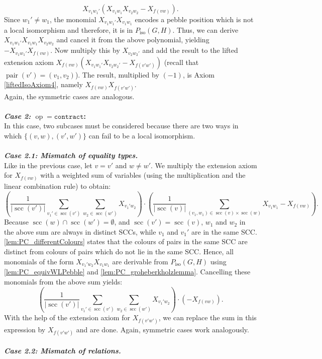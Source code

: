 \documentclass[10pt,a4paper]{article}
\newcommand{\sccOp }{\texttt{contract}}
\newcommand{\op}{\operatorname{op}}
\newcommand{\scc}{{\operatorname{scc}}}
\newcommand{\pair}{{\operatorname{pair}}}
\newcommand{\Piso}{P_{\text{iso}}}
\begin{document}
\[
X_{v_1w_1'}(X_{v_1w_1}X_{v_2w_2} - X_{f(vw)}).
\]
Since $w_1' \neq w_1$, the monomial $X_{v_1w_1'}X_{v_1w_1}$ encodes a pebble position which is not a local isomorphism and therefore, it is in $\Piso(G,H)$. Thus, we can derive $X_{v_1w_1'}X_{v_1w_1}X_{v_2w_2}$ and cancel it from the above polynomial, yielding $-X_{v_1w_1'}X_{f(vw)}$. Now multiply this by $X_{v_2w_2'}$ and add the result to the lifted extension axiom $X_{f(vw)}(X_{v_1w_1'}X_{v_2w_2'} -  X_{f(v'w')})$ (recall that $\pair(v') = (v_1,v_2)$). The result, multiplied by $(-1)$, is Axiom \eqref{liftedIsoAxiom4}, namely $X_{f(vw)}X_{f(v'w')}$.\\
Again, the symmetric cases are analogous.\\
\\
\textbf{\textit{Case 2:} $\op = \sccOp $:}\\
In this case, two subcases must be considered because there are two ways in which $\{(v,w),(v',w')\}$ can fail to be a local isomorphism.\\
\\
\textbf{\textit{Case 2.1: Mismatch of equality types.}}\\
Like in the previous case, let $v = v'$ and $w \neq w'$. 
We multiply the extension axiom for $X_{f(vw)}$ with a weighted sum of variables (using the  multiplication and the linear combination rule) to obtain:
\[
\left( \frac{1}{|\scc(v')|}\sum\limits_{v_1' \in \scc(v')}\sum\limits_{w_2 \in \scc(w')} X_{v_1'w_2} \right) \cdot \left(\frac{1}{|\scc(v)|}\sum\limits_{(v_1,w_1) \in \scc(v) \times \scc(w)}  X_{v_1  w_1} - X_{f(vw)}\right).
\]
Because $\scc(w) \cap \scc(w') = \emptyset$, and $\scc(v') = \scc(v)$, $w_1$ and $w_2$ in the above sum are always in distinct SCCs, while $v_1$ and $v_1'$ are in the same SCC. \autoref{lem:PC_differentColours} states that the colours of pairs in the same SCC are distinct from colours of pairs which do not lie in the same SCC. 
Hence, all monomials of the form $X_{v_1'w_2}X_{v_1 w_1}$ are derivable from $\Piso(G,H)$ using \autoref{lem:PC_equivWLPebble} and \autoref{lem:PC_groheberkholzlemma}. Cancelling these monomials from the above sum yields:
\[
\left( \frac{1}{|\scc(v')|}\sum\limits_{v_1' \in \scc(v')} \sum\limits_{w_2 \in \scc(w')} X_{v_1'w_2} \right) \cdot \left(- X_{f(vw)}\right).
\]
With the help of the extension axiom for $X_{f(v'w')}$, we can replace the sum in this expression by $X_{f(v'w')}$ and are done. Again, symmetric cases work analogously.\\
\\
\textbf{\textit{Case 2.2: Mismatch of relations.}}
\end{document}
